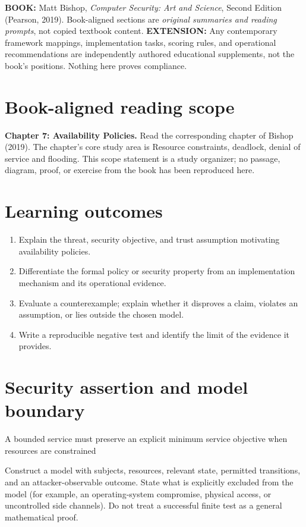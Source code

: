\documentclass[10pt,letterpaper]{article}
\begin{document}
\makedoctocpage
\begin{notebox}
\textbf{BOOK:} Matt Bishop, \emph{Computer Security: Art and Science}, Second Edition (Pearson, 2019). Book-aligned sections are \emph{original summaries and reading prompts}, not copied textbook content.
\textbf{EXTENSION:} Any contemporary framework mappings, implementation tasks, scoring rules, and operational recommendations are independently authored educational supplements, not the book's positions. Nothing here proves compliance.
\end{notebox}
\section{Book-aligned reading scope}
\textbf{Chapter 7: Availability Policies.} Read the corresponding chapter of Bishop (2019). The chapter's core study area is Resource constraints, deadlock, denial of service and flooding. This scope statement is a study organizer; no passage, diagram, proof, or exercise from the book has been reproduced here.
\section{Learning outcomes}
\begin{enumerate}
\item Explain the threat, security objective, and trust assumption motivating availability policies.
\item Differentiate the formal policy or security property from an implementation mechanism and its operational evidence.
\item Evaluate a counterexample; explain whether it disproves a claim, violates an assumption, or lies outside the chosen model.
\item Write a reproducible negative test and identify the limit of the evidence it provides.
\end{enumerate}
\section{Security assertion and model boundary}
\begin{infobox}
A bounded service must preserve an explicit minimum service objective when resources are constrained
\end{infobox}
Construct a model with subjects, resources, relevant state, permitted transitions, and an attacker-observable outcome. State what is explicitly excluded from the model (for example, an operating-system compromise, physical access, or uncontrolled side channels). Do not treat a successful finite test as a general mathematical proof.
\end{document}
